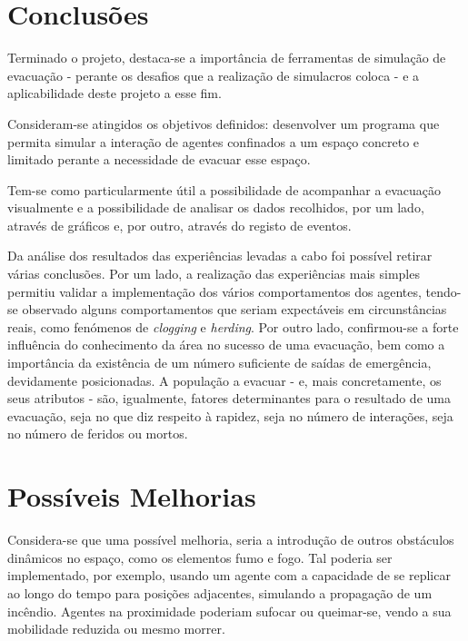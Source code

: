 \documentclass[12pt]{article}
\begin{document}
\begin{titlepage}
\begin{itemize}
\end{itemize}
	


\newpage
\section{Conclusões}

Terminado o projeto, destaca-se a importância de ferramentas de simulação de evacuação - perante os desafios que a realização de simulacros coloca - e a aplicabilidade deste projeto a esse fim.

Consideram-se atingidos os objetivos definidos: desenvolver um programa que permita simular a interação de agentes confinados a um espaço concreto e limitado perante a necessidade de evacuar esse espaço.

Tem-se como particularmente útil a possibilidade de acompanhar a evacuação visualmente e a possibilidade de analisar os dados recolhidos, por um lado, através de gráficos e, por outro, através do registo de eventos.

Da análise dos resultados das experiências levadas a cabo foi possível retirar várias conclusões. Por um lado, a realização das experiências mais simples permitiu validar a implementação dos vários comportamentos dos agentes, tendo-se observado alguns comportamentos que seriam expectáveis em circunstâncias reais, como fenómenos de \textit{clogging }e \textit{herding}.
Por outro lado, confirmou-se a forte influência do conhecimento da área no sucesso de uma evacuação, bem como a importância da existência de um número suficiente de saídas de emergência, devidamente posicionadas. A população a evacuar - e, mais concretamente, os seus atributos - são, igualmente, fatores determinantes para o resultado de uma evacuação, seja no que diz respeito à rapidez, seja no número de interações, seja no número de feridos ou mortos.

\section{Possíveis Melhorias}

Considera-se que uma possível melhoria, seria a introdução de outros obstáculos dinâmicos no espaço, como os elementos fumo e fogo. Tal poderia ser implementado, por exemplo, usando um agente com a capacidade de se replicar ao longo do tempo para posições adjacentes, simulando a propagação de um incêndio. Agentes na proximidade poderiam sufocar ou queimar-se, vendo a sua mobilidade reduzida ou mesmo morrer.


\end{titlepage}
\end{document}

